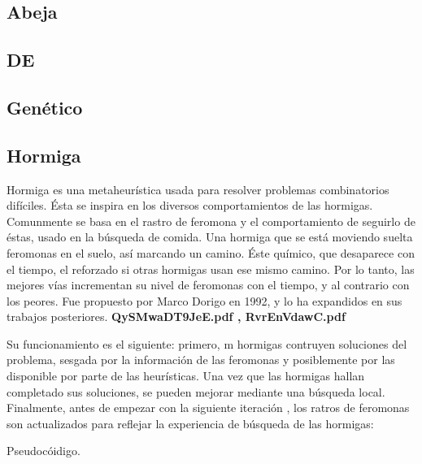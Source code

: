 \subsection{Abeja}

\subsection{DE}

\subsection{Gen\'etico}

\subsection{Hormiga}

Hormiga es una metaheurística usada para resolver problemas combinatorios
difíciles. \'Esta se inspira en los diversos comportamientos de las hormigas.
Comunmente se basa en el rastro de feromona y el comportamiento de seguirlo 
de éstas, usado en la búsqueda de comida. Una hormiga que se est\'a moviendo 
suelta feromonas en el suelo, as\'i marcando un camino. \'Este químico, que 
desaparece con el tiempo, el reforzado si otras hormigas usan ese mismo camino.
Por lo tanto, las mejores v\'ias incrementan su nivel de feromonas con el tiempo, 
y al contrario con los peores. Fue propuesto por Marco Dorigo en 1992, 
y lo ha expandidos en sus trabajos posteriores.
{\bf QySMwaDT9JeE.pdf , RvrEnVdawC.pdf}

Su funcionamiento es el siguiente: primero, m hormigas contruyen
soluciones del problema, sesgada por la informaci\'on de las feromonas y posiblemente
por las disponible por parte de las heur\'isticas. Una vez que las hormigas hallan completado
sus soluciones, se pueden mejorar mediante una b\'usqueda local. Finalmente,
antes de empezar con la siguiente iteraci\'on , los ratros de feromonas son
actualizados para reflejar la experiencia de b\'usqueda de las hormigas:

Pseudoc\'oidigo.

